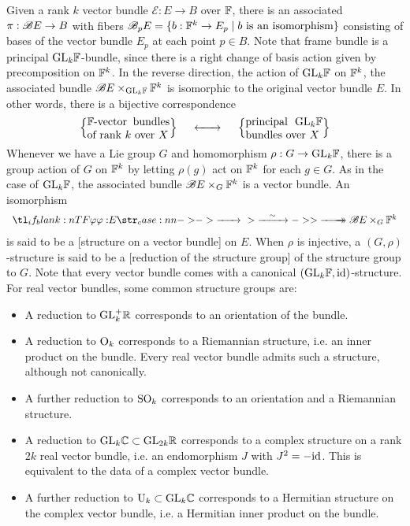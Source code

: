 Given a rank $k$ vector bundle $\mathcal{E} : E \to B$ over $\mathbb{F}$, there is an associated  $\pi : \mathscr{B} E \to B$ with fibers $\mathscr{B}_p E = \{ b : \mathbb{F}^k \to E_p \mid b\textrm{ is an isomorphism}\}$ consisting of bases of the vector bundle $E_p$ at each point $p\in B$. Note that frame bundle is a principal $\mathrm{GL}_k\mathbb{F}$-bundle, since there is a right change of basis action given by precomposition on $\mathbb{F}^k$.
In the reverse direction, the action of $\mathrm{GL}_k\mathbb{F}$ on $\mathbb{F}^k$, the associated bundle $\mathscr{B} E\times_{\mathrm{GL}_k\mathbb{F}} \mathbb{F}^k$ is isomorphic to the original vector bundle $E$. In other words, there is a bijective correspondence
\begin{equation}\label{eq:principal-GL-bundle-vector-bundle}
	\left\{\parbox{7.5em}{$\F$-vector bundles of rank $k$ over $X$}\right\}
	\quad\lkxleftrightto \quad
	\left\{\parbox{7em}{principal $\GL_k\F$ bundles over $X$}\right\}
\end{equation}
Whenever we have a Lie group $G$ and homomorphism $\rho : G \to \mathrm{GL}_k\mathbb{F}$, there is a group action of $G$ on $\mathbb{F}^k$ by letting $\rho(g)$ act on $\mathbb{F}^k$ for each $g\in G$. As in the case of $\mathrm{GL}_k \mathbb{F}$, the associated bundle $\mathscr{B} E\times_G \mathbb{F}^k$ is a vector bundle. An isomorphism
\begin{equation}\label{eq:structure-on-a-vector-bundle}
	\lkxfunc{\varphi}{E}{\B E\times_G \F^k}
\end{equation}
is said to be a [structure on a vector bundle] on $E$. When $\rho$ is injective, a $(G,\rho)$-structure is said to be a [reduction of the structure group] of the structure group to $G$.
Note that every vector bundle comes with a canonical $(\mathrm{GL}_k \mathbb{F}, \mathrm{id})$-structure.
For real vector bundles, some common structure groups are:
\begin{itemize}
	\item A reduction to $\mathrm{GL}^+_k\mathbb{R}$ corresponds to an orientation of the bundle.
	\item A reduction to $\mathrm{O}_k$ corresponds to a Riemannian structure, i.e. an inner product on the bundle. Every real vector bundle admits such a structure, although not canonically.
	\item A further reduction to $\mathrm{SO}_k$ corresponds to an orientation and a Riemannian structure.
	\item A reduction to $\mathrm{GL}_{k}\mathbb{C}\subset \mathrm{GL}_{2k}\mathbb{R}$ corresponds to a complex structure on a rank $2k$ real vector bundle, i.e. an endomorphism $J$ with $J^2=-\mathrm{id}$. This is equivalent to the data of a complex vector bundle.
	\item A further reduction to $\mathrm{U}_k\subset \mathrm{GL}_k\mathbb{C}$ corresponds to a Hermitian structure on the complex vector bundle, i.e. a Hermitian inner product on the bundle.
\end{itemize}

